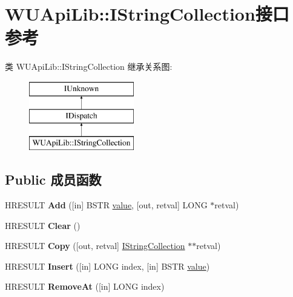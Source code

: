 \hypertarget{interface_w_u_api_lib_1_1_i_string_collection}{}\section{W\+U\+Api\+Lib\+:\+:I\+String\+Collection接口 参考}
\label{interface_w_u_api_lib_1_1_i_string_collection}
类 W\+U\+Api\+Lib\+:\+:I\+String\+Collection 继承关系图\+:\begin{figure}[H]
\begin{center}
\leavevmode
\includegraphics[height=3.000000cm]{interface_w_u_api_lib_1_1_i_string_collection}
\end{center}
\end{figure}
\subsection*{Public 成员函数}
\begin{DoxyCompactItemize}
\item 
\mbox{\label{interface_w_u_api_lib_1_1_i_string_collection_a6095b255fb53e885f0001153303574bb}} 
H\+R\+E\+S\+U\+LT {\bfseries Add} (\mbox{[}in\mbox{]} B\+S\+TR \hyperlink{unionvalue}{value}, \mbox{[}out, retval\mbox{]} L\+O\+NG $\ast$retval)
\item 
\mbox{\label{interface_w_u_api_lib_1_1_i_string_collection_a29968c7015c68b471311145f995cf080}} 
H\+R\+E\+S\+U\+LT {\bfseries Clear} ()
\item 
\mbox{\label{interface_w_u_api_lib_1_1_i_string_collection_aacd3bee22162e60852772fbe7d7b921a}} 
H\+R\+E\+S\+U\+LT {\bfseries Copy} (\mbox{[}out, retval\mbox{]} \hyperlink{interface_w_u_api_lib_1_1_i_string_collection}{I\+String\+Collection} $\ast$$\ast$retval)
\item 
\mbox{\label{interface_w_u_api_lib_1_1_i_string_collection_a0715c52ccb93c80c82c86cd5568d90eb}} 
H\+R\+E\+S\+U\+LT {\bfseries Insert} (\mbox{[}in\mbox{]} L\+O\+NG index, \mbox{[}in\mbox{]} B\+S\+TR \hyperlink{unionvalue}{value})
\item 
\mbox{\label{interface_w_u_api_lib_1_1_i_string_collection_a098ce35df52347d0f29214e4fc261928}} 
H\+R\+E\+S\+U\+LT {\bfseries Remove\+At} (\mbox{[}in\mbox{]} L\+O\+NG index)
\end{DoxyCompactItemize}
